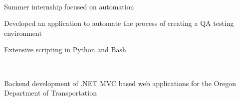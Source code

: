 \documentclass[]{hieudo-build}
\begin{document}
\begin{minipage}[t]{0.69\textwidth}
\sectionsep

 \\
\begin{tightemize}
\item Summer internship focused on automation
\item Developed an application to automate the process of creating a QA testing environment
\item Extensive scripting in Python and Bash
\end{tightemize}

\sectionsep

 \\
\begin{tightemize}
\item Backend development of .NET MVC based web applications for the Oregon Department of Transportation
\end{tightemize}
\sectionsep


\sectionsep



\end{minipage} 





\end{document}
